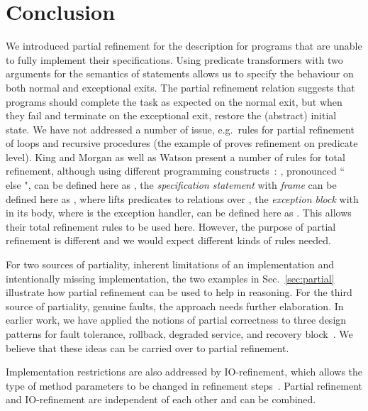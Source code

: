 \documentclass[submission,copyright,creativecommons]{eptcs}
\begin{document}
\section{Conclusion}
\label{sec:conclusion}



We introduced partial refinement for the description for programs that are unable to fully implement their specifications. Using predicate transformers with two arguments for the semantics of statements allows us to specify the behaviour on both normal and exceptional exits. The partial refinement relation suggests that programs should complete the task as expected on the normal exit, but when they fail and terminate on the exceptional exit, restore the (abstract) initial state. We have not addressed a number of issue, e.g.~rules for partial refinement of loops and recursive procedures (the example of  proves refinement on predicate level). King and Morgan as well as Watson present a number of rules for total refinement, although using different programming constructs~\cite{KingMorgan95ExitsInRefinementCalculus,Watson02RefiningExceptions}: , pronounced `` else ", can be defined here as , the \emph{specification statement}  with \emph{frame}  can be defined here as , where  lifts predicates  to relations over , the \emph{exception block}  with  in its body, where  is the exception handler, can be defined here as . This allows their total refinement rules to be used here. However, the purpose of partial refinement is different and we would expect different kinds of rules needed.

For two sources of partiality, inherent limitations of an implementation and intentionally missing implementation, the two examples in Sec.~\ref{sec:partial} illustrate how partial refinement can be used to help in reasoning. For the third source of partiality, genuine faults, the approach needs further elaboration. In earlier work, we have applied the notions of partial correctness to three design patterns for fault tolerance, rollback, degraded service, and recovery block~\cite{SekerinskiZhang11PartialCorrectness}. We believe that these ideas can be carried over to partial refinement.

Implementation restrictions are also addressed by IO-refinement, which allows the type of method parameters to be changed in refinement steps~\cite{BoitenDerrick98IORefinement, BanachaPoppletonJeskeaStepney07Retrenchment, DerrickBoiten01RefinementZObjectZ, MikhajlovaSekerinski97ClassInterfaceRefinement, StepneyCooperWoodcock98ZDataRefinement}. Partial refinement and IO-refinement are independent of each other and can be combined.
\end{document}
